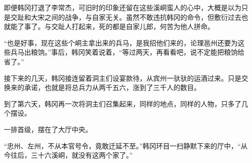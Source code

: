 即便韩冈打退了李常杰，可旧时的印象还留在这些溪峒蛮人的心中，大概是以为只是交趾和大宋之间的战争，与自家无关。虽然不敢违抗韩冈的命令，但敷衍过去也就能了事了。与交趾人打起来，死的都是自家儿郎，何苦为他人拼命。

“也是好事，现在这些个峒主拿出来的兵马，是我招他们来的，论理邕州还要为这些兵马出粮饷。”事后，韩冈笑着说着，“等过两天，再看看吧，说不定能把粮饷给省了。”

接下来的几天，韩冈接连留着洞主们设宴款待，从宾州一驮驮的运酒过来。只是交换来的承诺，也就是将总兵力从两千五六，涨到了三千人的数目。

到了第六天，韩冈再一次将洞主们召集起来，同样的地点，同样的人物，只多了几个摆设。

一排首级，摆在了大厅中央。

“忠州、左州，不从本官号令，竟敢迁延不至。”韩冈环目一扫静默下来的厅中，“从今往后，三十六溪峒，就没有这两个家了。”

